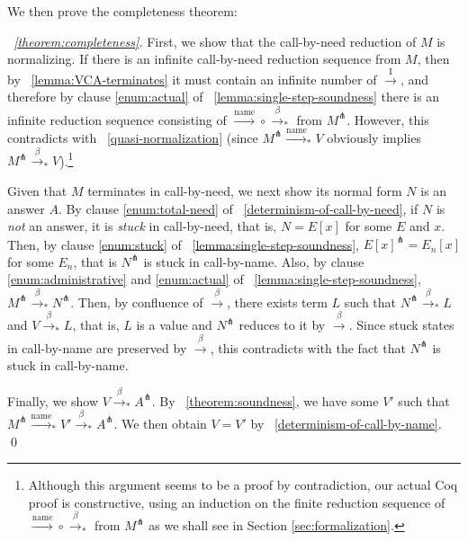 \documentclass{llncs}
\newcommand{\EXPANDLET}[1]{#1^\pitchfork}
\newcommand{\FULLBETA}{\xrightarrow{\beta}}
\newcommand{\CALLBYNAME}{\xrightarrow{\mathrm{name}}}
\newcommand{\CALLBYNEEDI}{\xrightarrow{\mathrm{I}}}
\newcommand{\RTCLOS}[1]{#1_*}
\begin{document}
We then prove the completeness theorem:
%
\begin{proof}[\theoremname~\ref{theorem:completeness}]
	First, we show that the call-by-need reduction of $M$ is normalizing.  If there is an infinite call-by-need reduction sequence from $M$, then by \lemmaname~\ref{lemma:VCA-terminates}
	it must contain an infinite number of $\CALLBYNEEDI$, and therefore by clause \ref{enum:actual} of \lemmaname~\ref{lemma:single-step-soundness} there is an infinite reduction sequence consisting of ${\CALLBYNAME}\circ{\RTCLOS{\FULLBETA}}$ from $\EXPANDLET{M}$.  However, this contradicts with \lemmaname~\ref{quasi-normalization}  (since $\EXPANDLET{M} \RTCLOS{\CALLBYNAME} V$ obviously implies $\EXPANDLET{M} \RTCLOS{\FULLBETA} V$).\footnote{Although this argument seems to be a proof by contradiction, our actual Coq proof is constructive, using an induction on the finite reduction sequence of ${\CALLBYNAME}\circ{\RTCLOS{\FULLBETA}}$ from $\EXPANDLET{M}$ as we shall see in Section \ref{sec:formalization}.}

	Given that $M$ terminates in call-by-need, we next show its normal form $N$ is an answer $A$.
	By clause \ref{enum:total-need} of \lemmaname~\ref{determinism-of-call-by-need},
	if $N$ is \emph{not} an answer, it is \emph{stuck} in call-by-need, that is, $N = E[x]$ for some $E$ and $x$.
	Then, by clause \ref{enum:stuck} of \lemmaname~\ref{lemma:single-step-soundness},
	$\EXPANDLET{E[x]} = E_n[x]$ for some $E_n$, that is $\EXPANDLET{N}$ is stuck in call-by-name.
	Also, by clause \ref{enum:administrative} and \ref{enum:actual} of \lemmaname~\ref{lemma:single-step-soundness}, $\EXPANDLET{M} \RTCLOS{\FULLBETA} \EXPANDLET{N}$.
	Then, by confluence of $\FULLBETA$, there exists term $L$ such that $\EXPANDLET{N} \RTCLOS{\FULLBETA} L$ and $V \RTCLOS{\FULLBETA} L$,
	that is, $L$ is a value and $\EXPANDLET{N}$ reduces to it by $\FULLBETA$.
	Since stuck states in call-by-name are preserved by $\FULLBETA$, this contradicts with the fact that $\EXPANDLET{N}$ is stuck in call-by-name.

	Finally, we show $V \RTCLOS{\FULLBETA} \EXPANDLET{A}$.
	By \theoremname~\ref{theorem:soundness}, we have some $V'$ such that $\EXPANDLET{M} \RTCLOS{\CALLBYNAME} V' \RTCLOS{\FULLBETA} \EXPANDLET{A}$.
	We then obtain $V=V'$ by \lemmaname~\ref{determinism-of-call-by-name}. \qed
\end{proof}
%
\end{document}
